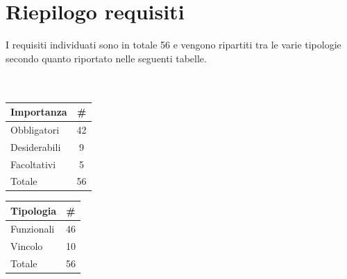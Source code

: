 

\section{Riepilogo requisiti}
I requisiti individuati sono in totale 56 e vengono ripartiti tra le varie tipologie secondo quanto riportato nelle seguenti tabelle.
\\ \\ \\
\begin{minipage}{\textwidth}
	\begin{minipage}[b]{0.49\textwidth}
		\centering
		\begin{tabular}{|l|c|} \hline
			\textbf{Importanza} & \textbf{\#} \\ \hline
			Obbligatori & 42 \\ \hline
			Desiderabili & 9 \\ \hline
			Facoltativi & 5 \\ \hline
			Totale & 56 \\ \hline
		\end{tabular}
	\end{minipage}
	\hfill
	\begin{minipage}[b]{0.49\textwidth}
		\centering
		\begin{tabular}{|l|c|} \hline
			\textbf{Tipologia} & \textbf{\#} \\ \hline
			Funzionali & 46 \\ \hline
			Vincolo & 10 \\ \hline
			Totale & 56 \\ \hline
		\end{tabular}
	\end{minipage}
\end{minipage}
\\ \\ \\

